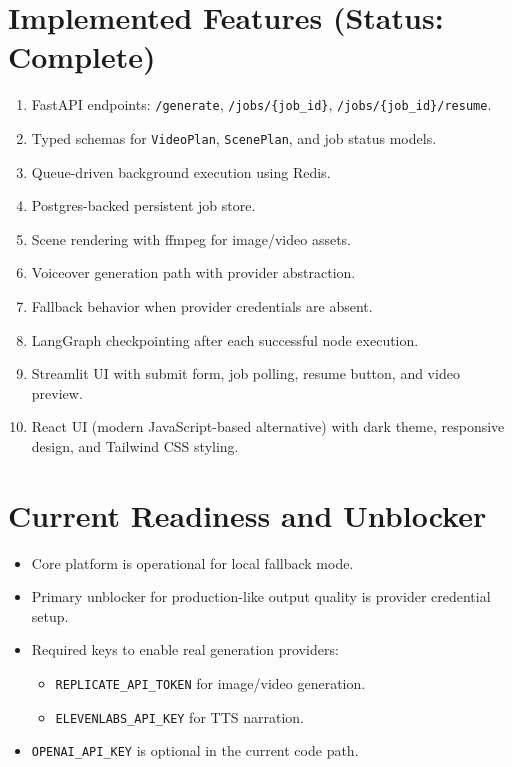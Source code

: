 \documentclass[11pt]{article}
\begin{document}
\section*{Implemented Features (Status: Complete)}
\begin{enumerate}[leftmargin=*]
  \item FastAPI endpoints: \texttt{/generate}, \texttt{/jobs/\{job\_id\}}, \texttt{/jobs/\{job\_id\}/resume}.
  \item Typed schemas for \texttt{VideoPlan}, \texttt{ScenePlan}, and job status models.
  \item Queue-driven background execution using Redis.
  \item Postgres-backed persistent job store.
  \item Scene rendering with ffmpeg for image/video assets.
  \item Voiceover generation path with provider abstraction.
  \item Fallback behavior when provider credentials are absent.
  \item LangGraph checkpointing after each successful node execution.
  \item Streamlit UI with submit form, job polling, resume button, and video preview.
  \item React UI (modern JavaScript-based alternative) with dark theme, responsive design, and Tailwind CSS styling.
\end{enumerate}

\section*{Current Readiness and Unblocker}
\begin{itemize}[leftmargin=*]
  \item Core platform is operational for local fallback mode.
  \item Primary unblocker for production-like output quality is provider credential setup.
  \item Required keys to enable real generation providers:
  \begin{itemize}
    \item \texttt{REPLICATE\_API\_TOKEN} for image/video generation.
    \item \texttt{ELEVENLABS\_API\_KEY} for TTS narration.
  \end{itemize}
  \item \texttt{OPENAI\_API\_KEY} is optional in the current code path.
\end{itemize}
\end{document}
